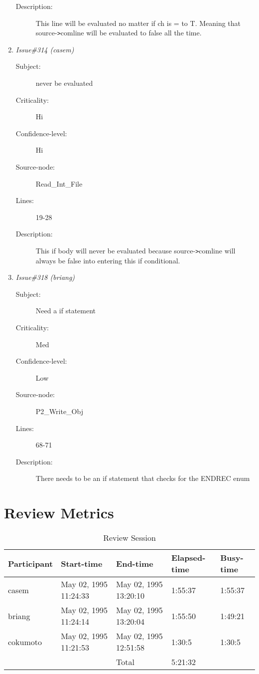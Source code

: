 \begin{enumerate}
\begin{description}
\item [Description:] This line will be evaluated no matter if ch is = to T.  Meaning that
source-{\tt >}comline will be evaluated to false all the time.
\end{description}
\item {\it Issue\#314 (casem)}
\begin{description}
\item [Subject:] never be evaluated
\item [Criticality:] Hi
\item [Confidence-level:] Hi
\item [Source-node:] Read\_Int\_File

\item [Lines:] 19-28

\item [Description:] This if body will never be evaluated because source-{\tt >}comline will always be
false into entering this if conditional.
\end{description}
\item {\it Issue\#318 (briang)}
\begin{description}
\item [Subject:] Need a if statement
\item [Criticality:] Med
\item [Confidence-level:] Low
\item [Source-node:] P2\_Write\_Obj

\item [Lines:] 68-71

\item [Description:] There needs to be an if statement that checks
for the ENDREC enum
\end{description}
\end{enumerate}
\section{Review Metrics}
\begin{table}[hb]
\begin{center}
\begin{tabular}{|l|l|l|l|l|}
\hline
Participant & Start-time & End-time & Elapsed-time & Busy-time \\
\hline
casem & May 02, 1995 11:24:33 & May 02, 1995 13:20:10 & 1:55:37 & 1:55:37 \\
briang & May 02, 1995 11:24:14 & May 02, 1995 13:20:04 & 1:55:50 & 1:49:21 \\
cokumoto & May 02, 1995 11:21:53 & May 02, 1995 12:51:58 & 1:30:5 & 1:30:5 \\
\hline
 & & Total & 5:21:32 & \\
\hline
\end{tabular}
\end{center}
\caption{Review Session}
\end{table}


